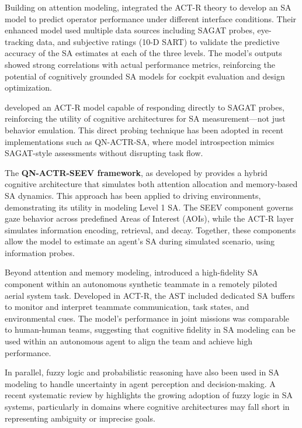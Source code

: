 \documentclass[12pt,a4paper]{article} %
\begin{document}
	Building on attention modeling, \textcite{chen_developing_2021} integrated the ACT-R theory to develop an SA model to predict operator performance under different interface conditions. Their enhanced model used multiple data sources including SAGAT probes, eye-tracking data, and subjective ratings (10-D SART) to validate the predictive accuracy of the SA estimates at each of the three levels. The model's outputs showed strong correlations with actual performance metrics, reinforcing the potential of cognitively grounded SA models for cockpit evaluation and design optimization.

	\textcite{juarez-espinosa_situation_nodate} developed an ACT-R model capable of responding directly to SAGAT probes, reinforcing the utility of cognitive architectures for SA measurement—not just behavior emulation. This direct probing technique has been adopted in recent implementations such as QN-ACTR-SA, where model introspection mimics SAGAT-style assessments without disrupting task flow.

	The \textbf{QN-ACTR-SEEV framework}, as developed by \textcite{rehman_phd_thesis} provides a hybrid cognitive architecture that simulates both attention allocation and memory-based SA dynamics. This approach has been applied to driving environments, demonstrating its utility in modeling Level 1 SA. The SEEV component governs gaze behavior across predefined Areas of Interest (AOIs), while the ACT-R layer simulates information encoding, retrieval, and decay. Together, these components allow the model to estimate an agent's SA during simulated scenario, using information probes.

	Beyond attention and memory modeling, \textcite{freiman_assessing_2019} introduced a high-fidelity SA component within an autonomous synthetic teammate in a remotely piloted aerial system task. Developed in ACT-R, the AST included dedicated SA buffers to monitor and interpret teammate communication, task states, and environmental cues. The model's performance in joint missions was comparable to human-human teams, suggesting that cognitive fidelity in SA modeling can be used within an autonomous agent to align the team and achieve high performance.

	In parallel, fuzzy logic and probabilistic reasoning have also been used in SA modeling to handle uncertainty in agent perception and decision-making. A recent systematic review by \textcite{daniello_fuzzy_2023} highlights the growing adoption of fuzzy logic in SA systems, particularly in domains where cognitive architectures may fall short in representing ambiguity or imprecise goals.
\end{document}
